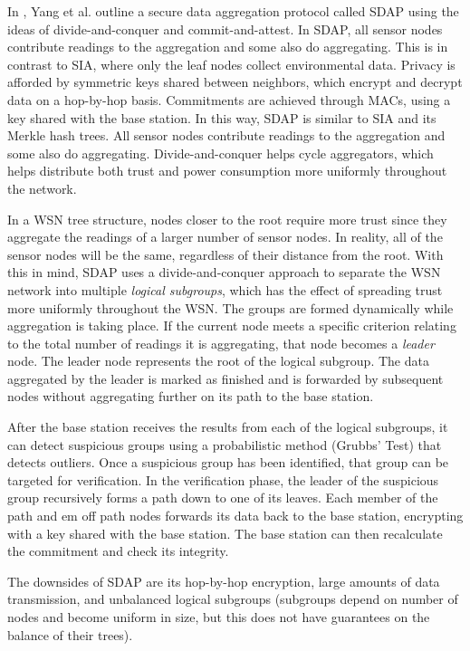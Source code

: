 \documentclass[a4paper]{article}
\begin{document}
In \cite{SDAP}, Yang et al. outline a secure data aggregation protocol called
SDAP using the ideas of divide-and-conquer and commit-and-attest. In SDAP, all
sensor nodes contribute readings to the aggregation and some also do
aggregating. This is in contrast to SIA, where only the leaf nodes collect
environmental data. Privacy is afforded by symmetric keys shared between
neighbors, which encrypt and decrypt data on a hop-by-hop basis. Commitments
are achieved through MACs, using a key shared with the base station. In this
way, SDAP is similar to SIA and its Merkle hash trees. All sensor nodes
contribute readings to the aggregation and some also do
aggregating. Divide-and-conquer helps cycle aggregators, which helps
distribute both trust and power consumption more uniformly throughout the
network.

In a WSN tree structure, nodes closer to the root require more trust since
they aggregate the readings of a larger number of sensor nodes. In reality,
all of the sensor nodes will be the same, regardless of their distance from
the root. With this in mind, SDAP uses a divide-and-conquer approach to
separate the WSN network into multiple {\em logical subgroups}, which has the
effect of spreading trust more uniformly throughout the WSN. The groups are
formed dynamically while aggregation is taking place. If the current node
meets a specific criterion relating to the total number of readings it is
aggregating, that node becomes a {\em leader} node. The leader node represents
the root of the logical subgroup. The data aggregated by the leader is marked
as finished and is forwarded by subsequent nodes without aggregating further
on its path to the base station.

After the base station receives the results from each of the logical
subgroups, it can detect suspicious groups using a probabilistic method
(Grubbs' Test) \cite{Grubb} that detects outliers. Once a suspicious group has
been identified, that group can be targeted for verification. In the
verification phase, the leader of the suspicious group recursively forms a
path down to one of its leaves. Each member of the path and {em off path
  nodes} forwards its data back to the base station, encrypting with a key
shared with the base station. The base station can then recalculate the
commitment and check its integrity.

The downsides of SDAP are its hop-by-hop encryption, large amounts of
data transmission, and unbalanced logical subgroups (subgroups
depend on number of nodes and become uniform in size, but this does
not have guarantees on the balance of their trees).
\end{document}
